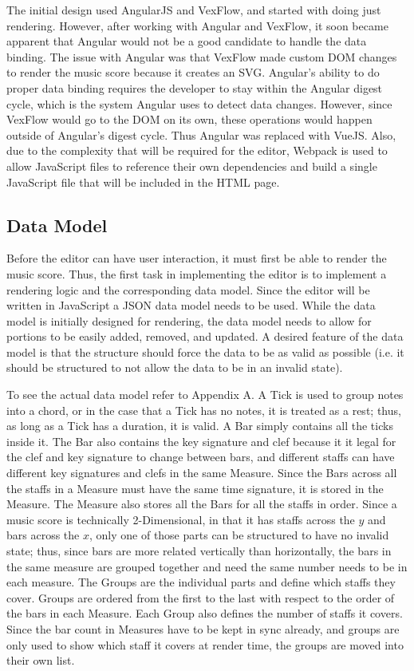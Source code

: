 \documentclass[letterpaper,12pt]{article}
\begin{document}
The initial design used AngularJS and VexFlow, and started with doing just rendering. However, after working with
Angular and VexFlow, it soon became apparent that Angular would not be a good candidate to handle the data binding. The
issue with Angular was that VexFlow made custom DOM changes to render the music score because it creates an SVG.
Angular's ability to do proper data binding requires the developer to stay within the Angular digest cycle, which is the
system Angular uses to detect data changes. However, since VexFlow would go to the DOM on its own, these operations
would happen outside of Angular's digest cycle. Thus Angular was replaced with VueJS. Also, due to the complexity that
will be required for the editor, Webpack is used to allow JavaScript files to reference their own dependencies and build
a single JavaScript file that will be included in the HTML page.

\subsection{Data Model}

Before the editor can have user interaction, it must first be able to render the music score. Thus, the first task in
implementing the editor is to implement a rendering logic and the corresponding data model. Since the editor will be
written in JavaScript a JSON data model needs to be used. While the data model is initially designed for rendering, the
data model needs to allow for portions to be easily added, removed, and updated. A desired feature of the data model is
that the structure should force the data to be as valid as possible (i.e. it should be structured to not allow the data
to be in an invalid state).

To see the actual data model refer to Appendix A. A Tick is used to group notes into a chord, or in the case that a Tick
has no notes, it is treated as a rest; thus, as long as a Tick has a duration, it is valid. A Bar simply contains all
the ticks inside it. The Bar also contains the key signature and clef because it it legal for the clef and key signature
to change between bars, and different staffs can have different key signatures and clefs in the same Measure. Since the
Bars across all the staffs in a Measure must have the same time signature, it is stored in the Measure. The Measure also
stores all the Bars for all the staffs in order. Since a music score is technically 2-Dimensional, in that it has staffs
across the $ y $ and bars across the $ x $, only one of those parts can be structured to have no invalid state; thus,
since bars are more related vertically than horizontally, the bars in the same measure are grouped together and need the
same number needs to be in each measure. The Groups are the individual parts and define which staffs they cover. Groups
are ordered from the first to the last with respect to the order of the bars in each Measure. Each Group also defines
the number of staffs it covers. Since the bar count in Measures have to be kept in sync already, and groups are only
used to show which staff it covers at render time, the groups are moved into their own list.
\end{document}
